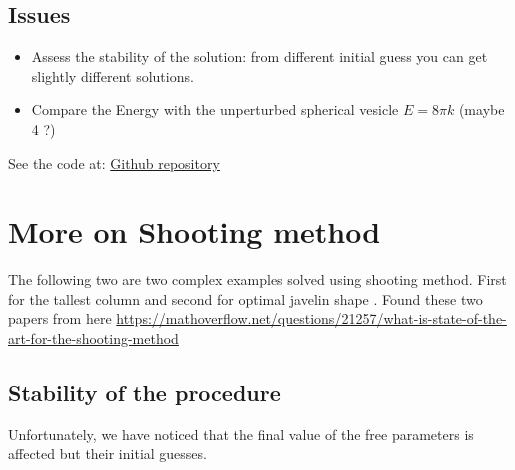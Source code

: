 \documentclass[12pt]{article}
\begin{document}


\subsection{Issues}
\begin{itemize}
    \item Assess the stability of the solution: from different initial guess you can get slightly different solutions.
    \item Compare the Energy with the unperturbed spherical vesicle $E=8 \pi k$ (maybe 4 ?)
\end{itemize}


See the code at: \href{https://github.com/pietro-sillano/shapes/tree/main}{Github repository}


\section{More on Shooting method}

The following two are two complex examples solved using shooting method. First for the tallest column \cite{farjounTallestColumnDynamical2008} and second for optimal javelin shape \cite{farjounOptimalShapeJavelin2007}. Found these two papers from here \url{https://mathoverflow.net/questions/21257/what-is-state-of-the-art-for-the-shooting-method}


\subsection{Stability of the procedure}
Unfortunately, we have noticed that the final value of the free parameters is affected but their initial guesses. 
\end{document}
